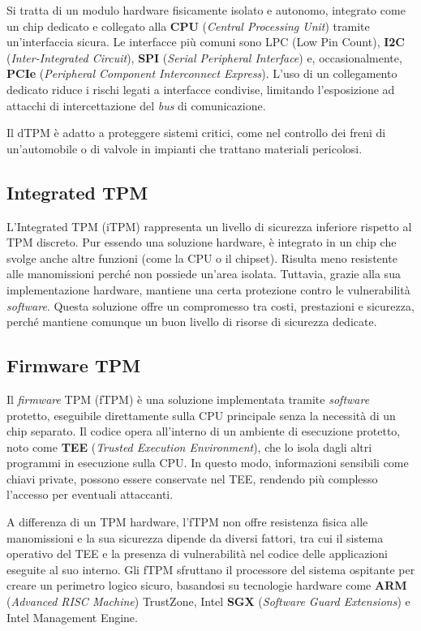 Si tratta di un modulo hardware fisicamente isolato e autonomo, integrato come un chip dedicato e collegato alla \textbf{CPU} (\textit{Central Processing Unit}) tramite un'interfaccia sicura. Le interfacce più comuni sono LPC (Low Pin Count), \textbf{I2C} (\textit{Inter-Integrated Circuit}), \textbf{SPI} (\textit{Serial Peripheral Interface}) e, occasionalmente, \textbf{PCIe} (\textit{Peripheral Component Interconnect Express}). L’uso di un collegamento dedicato riduce i rischi legati a interfacce condivise, limitando l’esposizione ad attacchi di intercettazione del \textit{bus} di comunicazione.

Il dTPM è adatto a proteggere sistemi critici, come nel controllo dei freni di un'automobile o di valvole in impianti che trattano materiali pericolosi. 

\subsection{Integrated TPM}
L'Integrated TPM (iTPM) rappresenta un livello di sicurezza inferiore rispetto al TPM discreto. Pur essendo una soluzione hardware, è integrato in un chip che svolge anche altre funzioni (come la CPU o il chipset). Risulta meno resistente alle manomissioni perché non possiede un’area isolata. Tuttavia, grazie alla sua implementazione hardware, mantiene una certa protezione contro le vulnerabilità \textit{software}. Questa soluzione offre un compromesso tra costi, prestazioni e sicurezza, perché mantiene comunque un buon livello di risorse di sicurezza dedicate.

\subsection{Firmware TPM}
Il \textit{firmware} TPM (fTPM) è una soluzione implementata tramite \textit{software} protetto, eseguibile direttamente sulla CPU principale senza la necessità di un chip separato. Il codice opera all'interno di un ambiente di esecuzione protetto, noto come \textbf{TEE} (\textit{Trusted Execution Environment}), che lo isola dagli altri programmi in esecuzione sulla CPU. In questo modo, informazioni sensibili come chiavi private, possono essere conservate nel TEE, rendendo più complesso l’accesso per eventuali attaccanti.

A differenza di un TPM hardware, l'fTPM non offre resistenza fisica alle manomissioni e la sua sicurezza dipende da diversi fattori, tra cui il sistema operativo del TEE e la presenza di vulnerabilità nel codice delle applicazioni eseguite al suo interno. Gli fTPM sfruttano il processore del sistema ospitante per creare un perimetro logico sicuro, basandosi su tecnologie hardware come \textbf{ARM} (\textit{Advanced RISC Machine}) TrustZone, Intel \textbf{SGX} (\textit{Software Guard Extensions}) e Intel Management Engine.

